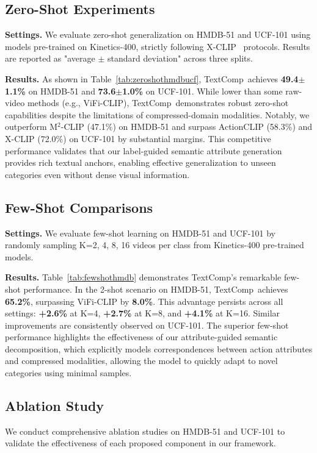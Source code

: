 \documentclass[letterpaper]{article} %
\newcommand{\methodname}{TextComp}
\begin{document}
\subsection{Zero-Shot Experiments}
\noindent\textbf{Settings.} We evaluate zero-shot generalization on HMDB-51 and UCF-101 using models pre-trained on Kinetics-400, strictly following X-CLIP~\cite{ni2022expanding} protocols. Results are reported as "average \ensuremath{\pm} standard deviation" across three splits.

\noindent\textbf{Results.} As shown in Table~\ref{tab:zeroshothmdbucf}, \methodname~achieves \textbf{49.4\ensuremath{\pm}1.1\%} on HMDB-51 and \textbf{73.6\ensuremath{\pm}1.0\%} on UCF-101. While lower than some raw-video methods (e.g., ViFi-CLIP), \methodname~demonstrates robust zero-shot capabilities despite the limitations of compressed-domain modalities. Notably, we outperform M\ensuremath{^2}-CLIP (47.1\%) on HMDB-51 and surpass ActionCLIP (58.3\%) and X-CLIP (72.0\%) on UCF-101 by substantial margins. This competitive performance validates that our label-guided semantic attribute generation provides rich textual anchors, enabling effective generalization to unseen categories even without dense visual information.

\subsection{Few-Shot Comparisons}
\noindent\textbf{Settings.} We evaluate few-shot learning on HMDB-51 and UCF-101 by randomly sampling K={2, 4, 8, 16} videos per class from Kinetics-400 pre-trained models.

\noindent\textbf{Results.} Table~\ref{tab:fewshothmdb} demonstrates \methodname's remarkable few-shot performance. In the 2-shot scenario on HMDB-51, \methodname~achieves \textbf{65.2\%}, surpassing ViFi-CLIP by \textbf{8.0\%}. This advantage persists across all settings: \textbf{+2.6\%} at K=4, \textbf{+2.7\%} at K=8, and \textbf{+4.1\%} at K=16. Similar improvements are consistently observed on UCF-101. The superior few-shot performance highlights the effectiveness of our attribute-guided semantic decomposition, which explicitly models correspondences between action attributes and compressed modalities, allowing the model to quickly adapt to novel categories using minimal samples.

\subsection{Ablation Study}
We conduct comprehensive ablation studies on HMDB-51 and UCF-101 to validate the effectiveness of each proposed component in our framework.
\end{document}
